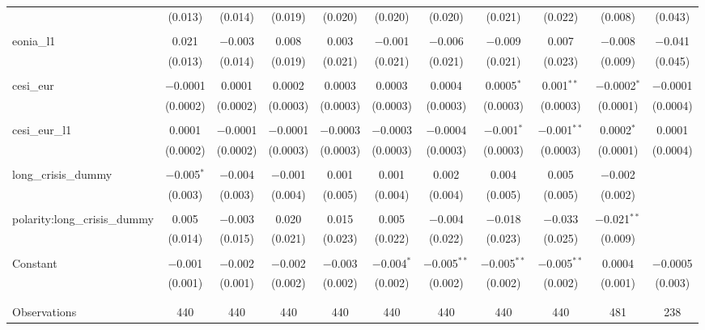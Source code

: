 \begin{table}[!htbp]
\begin{adjustbox}{width=1.35\textwidth}
\begin{tabular}{@{\extracolsep{5pt}}lcccccccccc}
  & (0.013) & (0.014) & (0.019) & (0.020) & (0.020) & (0.020) & (0.021) & (0.022) & (0.008) & (0.043) \\ 
  & & & & & & & & & & \\ 
 eonia\_l1 & 0.021 & $-$0.003 & 0.008 & 0.003 & $-$0.001 & $-$0.006 & $-$0.009 & 0.007 & $-$0.008 & $-$0.041 \\ 
  & (0.013) & (0.014) & (0.019) & (0.021) & (0.021) & (0.021) & (0.021) & (0.023) & (0.009) & (0.045) \\ 
  & & & & & & & & & & \\ 
 cesi\_eur & $-$0.0001 & 0.0001 & 0.0002 & 0.0003 & 0.0003 & 0.0004 & 0.0005$^{*}$ & 0.001$^{**}$ & $-$0.0002$^{*}$ & $-$0.0001 \\ 
  & (0.0002) & (0.0002) & (0.0003) & (0.0003) & (0.0003) & (0.0003) & (0.0003) & (0.0003) & (0.0001) & (0.0004) \\ 
  & & & & & & & & & & \\ 
 cesi\_eur\_l1 & 0.0001 & $-$0.0001 & $-$0.0001 & $-$0.0003 & $-$0.0003 & $-$0.0004 & $-$0.001$^{*}$ & $-$0.001$^{**}$ & 0.0002$^{*}$ & 0.0001 \\ 
  & (0.0002) & (0.0002) & (0.0003) & (0.0003) & (0.0003) & (0.0003) & (0.0003) & (0.0003) & (0.0001) & (0.0004) \\ 
  & & & & & & & & & & \\ 
 long\_crisis\_dummy & $-$0.005$^{*}$ & $-$0.004 & $-$0.001 & 0.001 & 0.001 & 0.002 & 0.004 & 0.005 & $-$0.002 &  \\ 
  & (0.003) & (0.003) & (0.004) & (0.005) & (0.004) & (0.004) & (0.005) & (0.005) & (0.002) &  \\ 
  & & & & & & & & & & \\ 
 polarity:long\_crisis\_dummy & 0.005 & $-$0.003 & 0.020 & 0.015 & 0.005 & $-$0.004 & $-$0.018 & $-$0.033 & $-$0.021$^{**}$ &  \\ 
  & (0.014) & (0.015) & (0.021) & (0.023) & (0.022) & (0.022) & (0.023) & (0.025) & (0.009) &  \\ 
  & & & & & & & & & & \\ 
 Constant & $-$0.001 & $-$0.002 & $-$0.002 & $-$0.003 & $-$0.004$^{*}$ & $-$0.005$^{**}$ & $-$0.005$^{**}$ & $-$0.005$^{**}$ & 0.0004 & $-$0.0005 \\ 
  & (0.001) & (0.001) & (0.002) & (0.002) & (0.002) & (0.002) & (0.002) & (0.002) & (0.001) & (0.003) \\ 
  & & & & & & & & & & \\ 
\hline \\[-1.8ex] 
Observations & 440 & 440 & 440 & 440 & 440 & 440 & 440 & 440 & 481 & 238 \\ 

\end{tabular}
\end{adjustbox}
\end{table}
